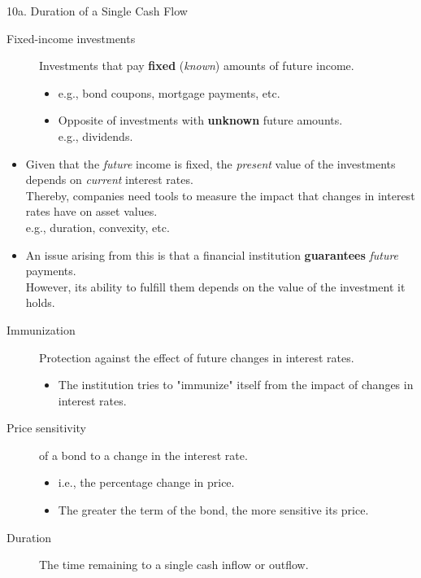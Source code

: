 \begin{CHPT_SUMM_AUTO}[label = {L.-10a}]{10a. Duration of a Single Cash Flow}
\begin{description}
	\item[Fixed-income investments]	Investments that pay \textbf{fixed} (\textit{known}) amounts of future income.
		\begin{itemize}[leftmargin = *]
		\item	e.g., bond coupons, mortgage payments, etc.
		\item	Opposite of investments with \textbf{unknown} future amounts.\\
				e.g., dividends.
		\end{itemize}
\end{description}
\begin{itemize}[leftmargin = *]
	\item	Given that the \textit{future} income is fixed, the \textit{present} value of the investments depends on \textit{current} interest rates.\\
			Thereby, companies need tools to measure the impact that changes in interest rates have on asset values.\\
			e.g., duration, convexity, etc.
	\item	An issue arising from this is that a financial institution \textbf{guarantees} \textit{future} payments.\\
			However, its ability to fulfill them depends on the value of the investment it holds.
\end{itemize}
\begin{description}
	\item[Immunization]	Protection against the effect of future changes in interest rates.
		\begin{itemize}[leftmargin = *]
		\item	The institution tries to "immunize" itself from the impact of changes in interest rates.
		\end{itemize}
\end{description}

	\tcbline

\begin{description}
	\item[Price sensitivity]	of a bond to a change in the interest rate.
		\begin{itemize}[leftmargin = *]
		\item	i.e., the percentage change in price.
		\item	The greater the term of the bond, the more sensitive its price.
		\end{itemize}
	\item[Duration]	The time remaining to a single cash inflow or outflow.
\end{description}


\end{CHPT_SUMM_AUTO}
